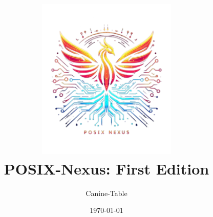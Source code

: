 \documentclass[../posix-nexus.tex]{subfiles}
\begin{document}
    \title{
        \includegraphics[width=0.5\textwidth]{setup/images/posix-nexus-icon.png}\\[1cm]
        \textbf{POSIX-Nexus}: First Edition
    }

    \author{Canine-Table}
    \date{\today}
    \maketitle
\end{document}
